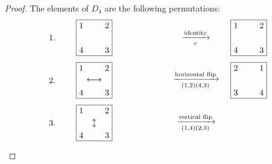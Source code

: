 \documentclass[12pt,reqno]{article}
\theoremstyle{plain}
\theoremstyle{definition}
\begin{document}
\begin{proof} The elements of \(D_4\) are the following permutations:
    \begin{align*}
        &\begin{tikzpicture}
            \draw (0,0) -- (0,1.5) -- (1.5,1.5) -- (1.5,0) -- (0,0);
            \node at (-1, 0.75) {1.};
            \node[above right] at (0,0) {4};
            \node[below right] at (0,1.5) {1};
            \node[below left] at (1.5,1.5) {2};
            \node[above left] at (1.5,0) {3};
            \node at (5,0.75) {\(\xrightarrow[e]{\text{identity}}\)};
        \end{tikzpicture}
        &\begin{tikzpicture}
            \draw (0,0) -- (0,1.5) -- (1.5,1.5) -- (1.5,0) -- (0,0);
            \node[below right] at (0,1.5) {1};
            \node[below left] at (1.5,1.5) {2};
            \node[above left] at (1.5,0) {3};
            \node[above right] at (0,0) {4};
        \end{tikzpicture}
        \\
        &\begin{tikzpicture}
            \draw (0,0) -- (0,1.5) -- (1.5,1.5) -- (1.5,0) -- (0,0);
            \node at (-1, 0.75) {2.};
            \node[below right] at (0,1.5) {1};
            \node[below left] at (1.5,1.5) {2};
            \node[above left] at (1.5,0) {3};
            \node[above right] at (0,0) {4};
            \node at (0.75,0.75) {\(\longleftrightarrow\)};
            \node at (5,0.75) {\(\xrightarrow[(1,2)(4,3)]{\text{horizontal flip}}\)};
        \end{tikzpicture}
        &\begin{tikzpicture}
            \draw (0,0) -- (0,1.5) -- (1.5,1.5) -- (1.5,0) -- (0,0);
            \node[below right] at (0,1.5) {2};
            \node[below left] at (1.5,1.5) {1};
            \node[above left] at (1.5,0) {4};
            \node[above right] at (0,0) {3};
        \end{tikzpicture}
        \\
        &\begin{tikzpicture}
            \draw (0,0) -- (0,1.5) -- (1.5,1.5) -- (1.5,0) -- (0,0);
            \node at (-1, 0.75) {3.};
            \node[below right] at (0,1.5) {1};
            \node[below left] at (1.5,1.5) {2};
            \node[above left] at (1.5,0) {3};
            \node[above right] at (0,0) {4};
            \node at (0.75,0.75) {\(\updownarrow\)};
            \node at (5,0.75) {\(\xrightarrow[(1,4)(2,3)]{\text{vertical flip}}\)};

\end{tikzpicture}
\end{align*}
\end{proof}
\end{document}
